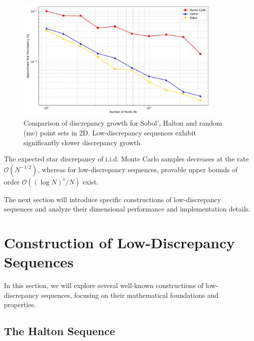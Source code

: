 \begin{figure}[H]
\centering
\includegraphics[width=0.9\textwidth]{Figures/qmc_discrepancy_comparison.pdf}
\caption{Comparison of discrepancy growth for Sobol', Halton and random
(\ac{mc}) point sets in 2D. Low-discrepancy sequences exhibit significantly
slower discrepancy growth.}
\label{fig:qmc-discrepancy-comparison}
\end{figure}

\begin{remark}
The expected star discrepancy of i.i.d. Monte Carlo samples decreases at the
rate $\mathcal{O}(N^{-1/2})$, whereas for low-discrepancy sequences, provable
upper bounds of order $\mathcal{O}((\log N)^s / N)$ exist.
\cite[Section~2.2]{leobacher2014introduction}
\end{remark}

The next section will introduce specific constructions of low-discrepancy
sequences and analyze their dimensional performance and implementation details.


\section{Construction of Low-Discrepancy Sequences}

In this section, we will explore several well-known constructions of
low-discrepancy sequences, focusing on their mathematical foundations and
properties.

\subsection{The Halton Sequence}
\label{subsec:halton-sequence}

